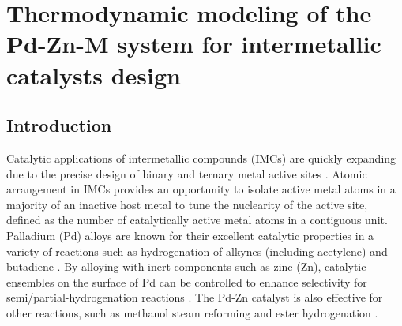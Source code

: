 \chapter{Thermodynamic modeling of the Pd-Zn-M system for intermetallic catalysts design} \label{chap:intermetallics}

\section{Introduction} \label{intermetallics:sec:intro}
Catalytic applications of intermetallic compounds (IMCs) are quickly expanding due to the precise design of binary and ternary metal active sites \cite{armbruster2014intermetallic, dasgupta2019intermetallics, furukawa2017intermetallic, armbruster2020intermetallic, yang2020intermetallic}. Atomic arrangement in IMCs provides an opportunity to isolate active metal atoms in a majority of an inactive host metal to tune the nuclearity of the active site, defined as the number of catalytically active metal atoms in a contiguous unit. Palladium (Pd) alloys are known for their excellent catalytic properties in a variety of reactions such as hydrogenation of alkynes (including acetylene) and butadiene \cite{teschner2006alkyne, zhou2016pdzn, sarkany1993hydrogenation}. By alloying with inert components such as zinc (Zn), catalytic ensembles on the surface of Pd can be controlled to enhance selectivity for semi/partial-hydrogenation reactions \cite{zhou2016pdzn, Dasgupta2022}. The Pd-Zn catalyst is also effective for other reactions, such as methanol steam reforming and ester hydrogenation \cite{conant2008stability, green1993ester}.

